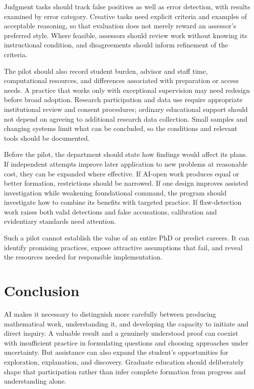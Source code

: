 \documentclass[11pt]{article}
\begin{document}
Judgment tasks should track false positives as well as error detection, with results
examined by error category. Creative tasks need explicit criteria and examples of
acceptable reasoning, so that evaluation does not merely reward an assessor's preferred
style. Where feasible, assessors should review work without knowing its instructional
condition, and disagreements should inform refinement of the criteria.

The pilot should also record student burden, advisor and staff time, computational
resources, and differences associated with preparation or access needs. A practice
that works only with exceptional supervision may need redesign before broad adoption.
Research participation and data use require appropriate institutional review and
consent procedures; ordinary educational support should not depend on agreeing to
additional research data collection. Small samples and changing systems limit what
can be concluded, so the conditions and relevant tools should be documented.

Before the pilot, the department should state how findings would affect its plans.
If independent attempts improve later application to new problems at reasonable cost, they can be
expanded where effective. If AI-open work produces equal or better formation, restrictions
should be narrowed. If one design improves assisted investigation while weakening
foundational command, the program should investigate how to combine its benefits with
targeted practice. If flaw-detection work raises both valid detections and false
accusations, calibration and evidentiary standards need attention.

Such a pilot cannot establish the value of an entire PhD or predict careers. It can
identify promising practices, expose attractive assumptions that fail, and reveal the
resources needed for responsible implementation.

\clearpage
\section{Conclusion}

AI makes it necessary to distinguish more carefully between producing mathematical
work, understanding it, and developing the capacity to initiate and direct inquiry.
A valuable result and a genuinely understood proof can coexist with insufficient
practice in formulating questions and choosing approaches under uncertainty. But
assistance can also expand the student's opportunities for exploration, explanation,
and discovery. Graduate education should deliberately shape that participation rather
than infer complete formation from progress and understanding alone.
\end{document}
